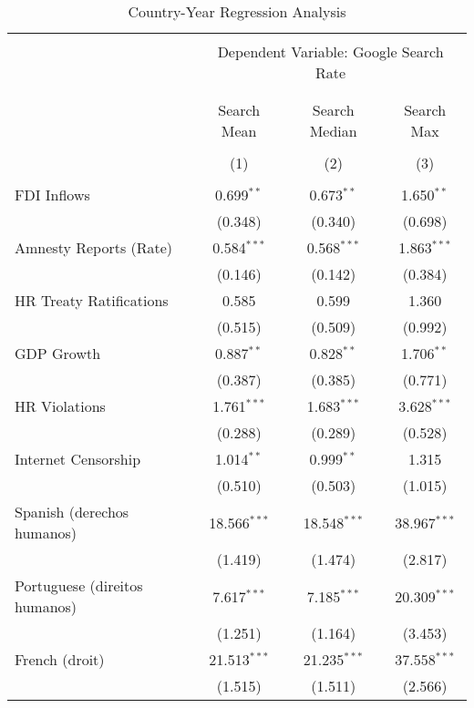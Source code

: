 
\begin{table}[!htbp] \centering 
  \caption{Country-Year Regression Analysis} 
  \label{} 
\begin{tabular}{@{\extracolsep{5pt}}lccc} 
\\[-1.8ex]\hline 
\hline \\[-1.8ex] 
 & \multicolumn{3}{c}{Dependent Variable: Google Search Rate} \\ 
\cline{2-4} 
\\[-1.8ex] & \multicolumn{3}{c}{ } \\ 
 & Search Mean & Search Median & Search Max \\ 
\\[-1.8ex] & (1) & (2) & (3)\\ 
\hline \\[-1.8ex] 
 FDI Inflows & 0.699$^{**}$ & 0.673$^{**}$ & 1.650$^{**}$ \\ 
  & (0.348) & (0.340) & (0.698) \\ 
  Amnesty Reports (Rate) & 0.584$^{***}$ & 0.568$^{***}$ & 1.863$^{***}$ \\ 
  & (0.146) & (0.142) & (0.384) \\ 
  HR Treaty Ratifications & 0.585 & 0.599 & 1.360 \\ 
  & (0.515) & (0.509) & (0.992) \\ 
  GDP Growth & 0.887$^{**}$ & 0.828$^{**}$ & 1.706$^{**}$ \\ 
  & (0.387) & (0.385) & (0.771) \\ 
  HR Violations & 1.761$^{***}$ & 1.683$^{***}$ & 3.628$^{***}$ \\ 
  & (0.288) & (0.289) & (0.528) \\ 
  Internet Censorship & 1.014$^{**}$ & 0.999$^{**}$ & 1.315 \\ 
  & (0.510) & (0.503) & (1.015) \\ 
  Spanish (derechos humanos) & 18.566$^{***}$ & 18.548$^{***}$ & 38.967$^{***}$ \\ 
  & (1.419) & (1.474) & (2.817) \\ 
  Portuguese (direitos humanos) & 7.617$^{***}$ & 7.185$^{***}$ & 20.309$^{***}$ \\ 
  & (1.251) & (1.164) & (3.453) \\ 
  French (droit) & 21.513$^{***}$ & 21.235$^{***}$ & 37.558$^{***}$ \\ 
  & (1.515) & (1.511) & (2.566) \\ 

\end{tabular}
\end{table}
